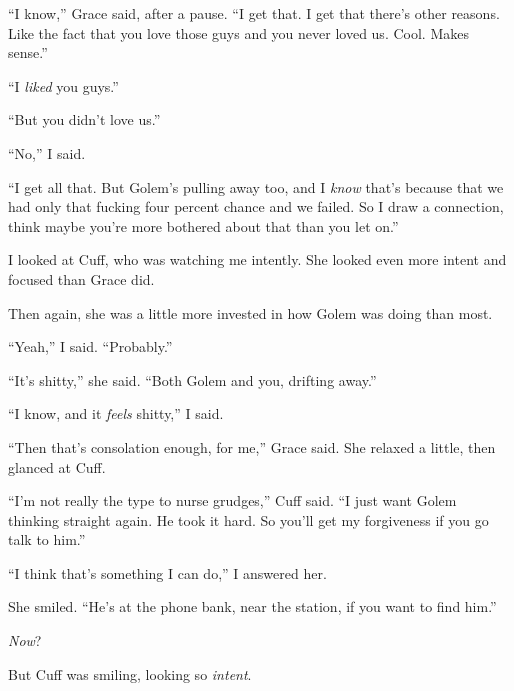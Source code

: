 ``I know,'' Grace said, after a pause.  ``I get that.  I get that there's other reasons.  Like the fact that you love those guys and you never loved us.  Cool.  Makes sense.''



``I \emph{liked} you guys.''



``But you didn't love us.''



``No,'' I said.



``I get all that.  But Golem's pulling away too, and I \emph{know} that's because that we had only that fucking four percent chance and we failed.  So I draw a connection, think maybe you're more bothered about that than you let on.''



I looked at Cuff, who was watching me intently.  She looked even more intent and focused than Grace did.



Then again, she was a little more invested in how Golem was doing than most.



``Yeah,'' I said.  ``Probably.''



``It's shitty,'' she said.  ``Both Golem and you, drifting away.''



``I know, and it \emph{feels} shitty,'' I said.



``Then that's consolation enough, for me,'' Grace said.  She relaxed a little, then glanced at Cuff.



``I'm not really the type to nurse grudges,'' Cuff said.  ``I just want Golem thinking straight again.  He took it hard.  So you'll get my forgiveness if you go talk to him.''



``I think that's something I can do,'' I answered her.



She smiled.  ``He's at the phone bank, near the station, if you want to find him.''



\emph{Now}?



But Cuff was smiling, looking so \emph{intent}.



